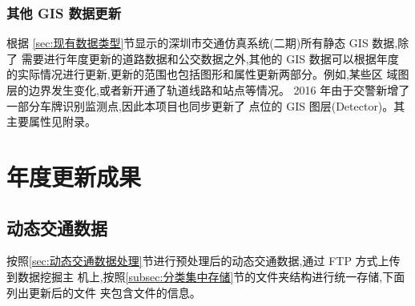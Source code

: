 \subsubsection{其他 GIS 数据更新}
根据 \ref{sec:现有数据类型}节显示的深圳市交通仿真系统(二期)所有静态 GIS 数据,除了
需要进行年度更新的道路数据和公交数据之外,其他的 GIS 数据可以根据年度
的实际情况进行更新,更新的范围也包括图形和属性更新两部分。例如,某些区
域图层的边界发生变化,或者新开通了轨道线路和站点等情况。
2016 年由于交警新增了一部分车牌识别监测点,因此本项目也同步更新了
点位的 GIS 图层(Detector)。其主要属性见附录。

\section{年度更新成果}
\subsection{动态交通数据}
按照\ref{sec:动态交通数据处理}节进行预处理后的动态交通数据,通过 FTP 方式上传到数据挖掘主
机上,按照\ref{subsec:分类集中存储}节的文件夹结构进行统一存储,下面列出更新后的文件
夹包含文件的信息。

